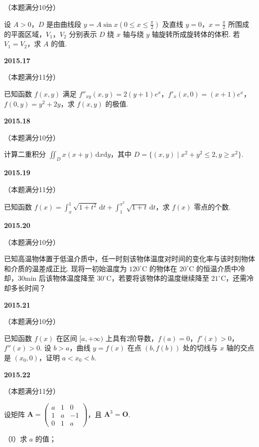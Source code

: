 \documentclass[UTF8,12pt,fontset=windows]{ctexart}
\begin{document}
（本题满分10分）

设 $A > 0$，$D$ 是由曲线段 $y = A\sin x \left(0 \leqslant x \leqslant \frac{\pi}{2}\right)$ 及直线 $y = 0$，$x = \frac{\pi}{2}$ 所围成的平面区域，$V_1$，$V_2$ 分别表示 $D$ 绕 $x$ 轴与绕 $y$ 轴旋转所成旋转体的体积. 若 $V_1 = V_2$，求 $A$ 的值.

\vfill
\newpage
{\large\bfseries 2015.17}

（本题满分11分）

已知函数 $f(x, y)$ 满足 $f''_{xy}(x, y) = 2(y + 1)e^x$，$f'_x(x, 0) = (x + 1)e^x$，$f(0, y) = y^2 + 2y$，求 $f(x, y)$ 的极值.

\vfill
\newpage
{\large\bfseries 2015.18}

（本题满分10分）

计算二重积分 $\iint_D x(x + y)\,\mathrm{d}x\mathrm{d}y$，其中 $D = \{(x, y) \mid x^2 + y^2 \leqslant 2, y \geqslant x^2\}$.

\vfill
\newpage
{\large\bfseries 2015.19}

（本题满分11分）

已知函数 $f(x) = \int_x^1 \sqrt{1 + t^2}\,\mathrm{d}t + \int_1^{x^2} \sqrt{1 + t}\,\mathrm{d}t$，求 $f(x)$ 零点的个数.

\vfill
\newpage
{\large\bfseries 2015.20}

（本题满分10分）

已知高温物体置于低温介质中，任一时刻该物体温度对时间的变化率与该时刻物体和介质的温差成正比. 现将一初始温度为 $120^\circ\mathrm{C}$ 的物体在 $20^\circ\mathrm{C}$ 的恒温介质中冷却，$30\mathrm{min}$ 后该物体温度降至 $30^\circ\mathrm{C}$，若要将该物体的温度继续降至 $21^\circ\mathrm{C}$，还需冷却多长时间？

\vfill
\newpage
{\large\bfseries 2015.21}

（本题满分10分）

已知函数 $f(x)$ 在区间 $[a, +\infty)$ 上具有2阶导数，$f(a) = 0$，$f'(x) > 0$，$f''(x) > 0$. 设 $b > a$，曲线 $y = f(x)$ 在点 $(b, f(b))$ 处的切线与 $x$ 轴的交点是 $(x_0, 0)$，证明 $a < x_0 < b$.

\vfill
\newpage
{\large\bfseries 2015.22}

（本题满分11分）

设矩阵 $\boldsymbol{A} = \begin{pmatrix} a & 1 & 0 \\ 1 & a & -1 \\ 0 & 1 & a \end{pmatrix}$，且 $\boldsymbol{A}^3 = \boldsymbol{O}$.

（Ⅰ）求 $a$ 的值；
\end{document}
